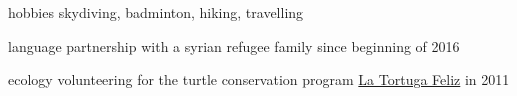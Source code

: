


       
\begin{cvextracurr}
	\cvextra
    {hobbies} %
	{skydiving, badminton, hiking, travelling}
	
	\cvextra
    {language partnership} %
	{with a syrian refugee family since beginning of 2016}
	
	\cvextra
    {ecology volunteering} %
	{for the turtle conservation program \href{http://www.latortugafeliz.com/}{La Tortuga Feliz} in 2011}
    
\end{cvextracurr}

